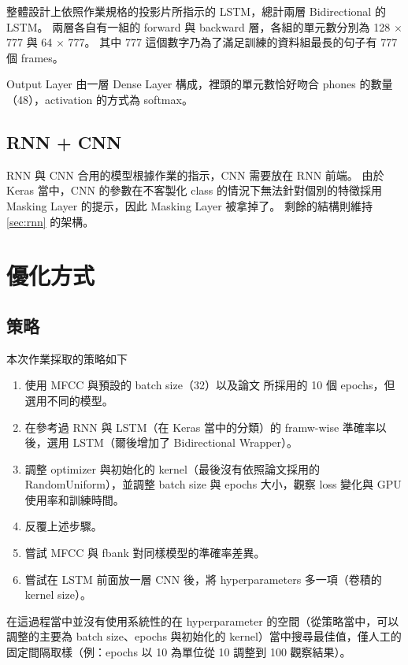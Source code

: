 \documentclass[final,3p]{elsarticle}
\begin{document}
		整體設計上依照作業規格的投影片所指示的 LSTM，總計兩層 Bidirectional 的 LSTM。
		兩層各自有一組的 forward 與 backward 層，各組的單元數分別為 128 $\times$ 777 與 64 $\times$ 777。
		其中 777 這個數字乃為了滿足訓練的資料組最長的句子有 777 個 frames。
		
		Output Layer 由一層 Dense Layer 構成，裡頭的單元數恰好吻合 phones 的數量（48），activation 的方式為 softmax。
		
	\subsection{RNN + CNN}
	\label{sec:cnn}
		RNN 與 CNN 合用的模型根據作業的指示，CNN 需要放在 RNN 前端。
		由於 Keras 當中，CNN 的參數在不客製化 class 的情況下無法針對個別的特徵採用 Masking Layer 的提示，因此 Masking Layer 被拿掉了。
		剩餘的結構則維持 \cref{sec:rnn} 的架構。
		
\section{優化方式}
	\subsection{策略}
		本次作業採取的策略如下
		\begin{enumerate}
			\item 使用 MFCC 與預設的 batch size（32）以及論文 \cite{Graves_2005} 所採用的 10 個 epochs，但選用不同的模型。
			\item 在參考過 RNN 與 LSTM（在 Keras 當中的分類）的 framw-wise 準確率以後，選用 LSTM（爾後增加了 Bidirectional Wrapper）。
			\item 調整 optimizer 與初始化的 kernel（最後沒有依照論文採用的 RandomUniform），並調整 batch size 與 epochs 大小，觀察 loss 變化與 GPU 使用率和訓練時間。
			\item 反覆上述步驟。
			\item 嘗試 MFCC 與 fbank 對同樣模型的準確率差異。
			\item 嘗試在 LSTM 前面放一層 CNN 後，將 hyperparameters 多一項（卷積的 kernel size）。
		\end{enumerate}
		
		在這過程當中並沒有使用系統性的在 hyperparameter 的空間（從策略當中，可以調整的主要為 batch size、epochs 與初始化的 kernel）當中搜尋最佳值，僅人工的固定間隔取樣（例：epochs 以 10 為單位從 10 調整到 100 觀察結果）。
	
\end{document}
